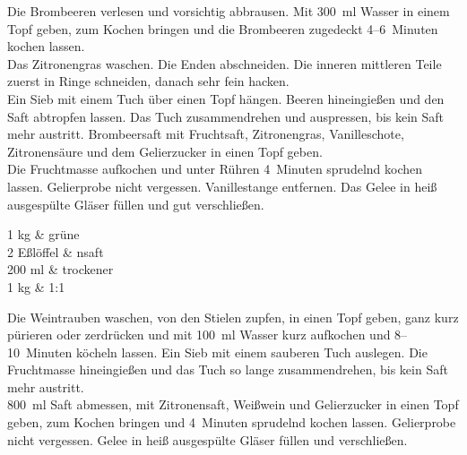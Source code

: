 
      \begin{zubereitung}
        Die Brombeeren verlesen und vorsichtig abbrausen. Mit 300~ml Wasser in
	einem Topf geben, zum Kochen bringen und die Brombeeren zugedeckt
	4--6~Minuten kochen lassen. \\
	Das Zitronengras waschen. Die Enden abschneiden. Die inneren mittleren
	Teile zuerst in Ringe schneiden, danach sehr fein hacken. \\
	Ein Sieb mit einem Tuch über einen Topf hängen. Beeren hineingießen
	und den Saft abtropfen lassen. Das Tuch zusammendrehen und auspressen,
	bis kein Saft mehr austritt. Brombeersaft mit Fruchtsaft, Zitronengras,
	Vanilleschote, Zitronensäure und dem Gelierzucker in einen Topf geben.
	\\
	Die Fruchtmasse aufkochen und unter Rühren 4~Minuten sprudelnd
	kochen lassen. Gelierprobe nicht vergessen. Vanillestange entfernen.
	Das Gelee in heiß ausgespülte Gläser füllen und gut verschließen. \\
      \end{zubereitung}


      \begin{zutaten}
        1\breh{} kg & grüne  \\
	2 Eßlöffel & nsaft \\
	200 ml & trockener  \\
	1 kg &  1:1 \\
      \end{zutaten}


      \begin{zubereitung}
        Die Weintrauben waschen, von den Stielen zupfen, in einen Topf geben,
	ganz kurz pürieren oder zerdrücken und mit 100~ml Wasser kurz
	aufkochen und 8--10~Minuten köcheln lassen. Ein Sieb mit einem
	sauberen Tuch auslegen. Die Fruchtmasse hineingießen und das Tuch so
	lange zusammendrehen, bis kein Saft mehr austritt. \\
	800~ml Saft abmessen, mit Zitronensaft, Weißwein und Gelierzucker in
	einen Topf geben, zum Kochen bringen und 4~Minuten sprudelnd kochen
	lassen. Gelierprobe nicht vergessen. Gelee in heiß ausgespülte Gläser
	füllen und verschließen. \\
      \end{zubereitung}


